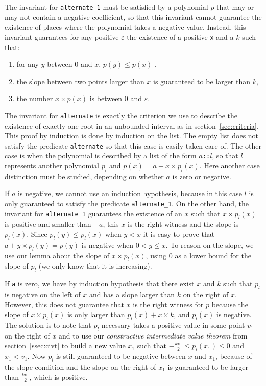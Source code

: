\documentclass{mscs}
\begin{document}
The invariant for {\tt alternate\_1}
must be satisfied by a polynomial \(p\) that may or may not contain a negative
coefficient, so that this invariant cannot guarantee the existence of
places where the polynomial takes a negative value.  Instead, this invariant
guarantees for any positive \(\varepsilon\) the existence of a positive {\tt x}
and a \(k\) such that:
\begin{enumerate}
\item for any \(y\) between \(0\) and \(x\), \(p(y) \leq p (x)\) ,
\item the slope between two points larger than \(x\) is guaranteed to be larger
than \(k\),
\item the number \(x \times p(x)\) is between \(0\) and \(\varepsilon\).
\end{enumerate}

The invariant for {\tt alternate} is exactly the criterion we use
to describe the existence of exactly one root in an unbounded
interval as in section~\ref{sec:criteria}.
This proof by induction is done by induction on the list.  The empty list
does not satisfy the predicate {\tt alternate} so that this case is
easily taken care of.  The other case is when the polynomial is described
by a list of the form {\tt \(a\)::\(l\)}, so that \(l\) represents another polynomial
\(p_l\) and \(p(x) = a + x \times p_l(x)\).  Here another case distinction must be
studied, depending on whether \(a\) is zero or negative.

If \(a\) is negative, we cannot use an induction hypothesis, because in
this case \(l\) is only guaranteed to satisfy the predicate
{\tt alternate\_1}.  On the other hand, the invariant for {\tt alternate\_1}
guarantees the existence of an \(x\) such that \(x\times p_l(x)\) is positive
and smaller than \(-a\), this \(x\) is the right witness and the slope is
\(p_l(x)\).  Since \(p_l(y) \leq p_l(x)\) when \(y< x\) it is easy to
prove that \(a+y\times p_l(y)=p(y)\) is negative when \(0 < y \leq x\).  To reason on the slope, we use our lemma about the
slope of \(x \times p_l(x)\), using \(0\) as a lower bound for the slope of \(p_l\) (we only
know that it is increasing).

If {\tt a} is
zero, we have by induction hypothesis that there exist \(x\) and \(k\)
such that \(p_l\) is negative on the left of \(x\) and has a slope larger than
\(k\) on the right of \(x\).  However, this does not guarantee that \(x\) is
the right witness for \(p\) because the slope of \(x\times p_l(x)\) is only
larger than \(p_l(x) + x \times k\), and \(p_l(x)\) is negative.  The solution
is to note that \(p_l\) necessary takes a positive value in some point \(v_1\)
on the right of \(x\) and to use our
{\em constructive intermediate value theorem} from
section~\ref{ssec:civt} to
build a new value \(x_1\) such that \(-\frac{k v_1}{2} \leq p_l(x_1)
\leq 0\) and \(x_1 < v_1\).
Now \(p_l\) is still guaranteed to be negative between \(x\) and \(x_1\),
because of the slope condition and the slope on the right of \(x_1\) is
guaranteed to be larger than \(\frac{k v_1}{2}\), which is positive.
\end{document}
